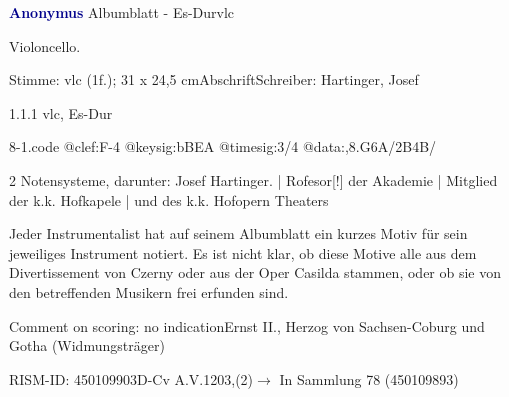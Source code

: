 \documentclass[a4paper, twocolumn, 11pt]{book}
\begin{document}
\par \vspace{16pt} \textcolor{darkblue}{\textbf{Anonymus  }}\hfillplus{[8]}\newline Albumblatt - Es-Dur\newline vlc
\par \begin{itshape}[heading:] Violoncello.\end{itshape} 
\par \textcolor{darkblue}{}  Stimme: vlc  (1f.); 31 x 24,5 cm\newline Abschrift\newline Schreiber: Hartinger, Josef
\par 1.1.1  vlc, Es-Dur  
\begin{filecontents*}{8-1.code}
@clef:F-4
@keysig:bBEA
@timesig:3/4
@data:,{8.G6A}/2B4B/%
\end{filecontents*}
\newline %
\par 2 Notensysteme, darunter: Josef Hartinger. | Rofesor[!] der Akademie | Mitglied der k.k. Hofkapele | und des k.k. Hofopern Theaters
\par Jeder Instrumentalist hat auf seinem Albumblatt ein kurzes Motiv für sein jeweiliges Instrument notiert. Es ist nicht klar, ob diese Motive alle aus dem {\textquotedbl}Divertissement{\textquotedbl} von Czerny oder aus der Oper {\textquotedbl}Casilda{\textquotedbl} stammen, oder ob sie von den betreffenden Musikern frei erfunden sind.
\par Comment on scoring: no indication\newline Ernst II., Herzog von Sachsen-Coburg und Gotha  (Widmungsträger)
\par RISM-ID: 450109903\newline D-Cv  A.V.1203,(2)\newline $\rightarrow$ In Sammlung 78 (450109893)
      
\end{document}
